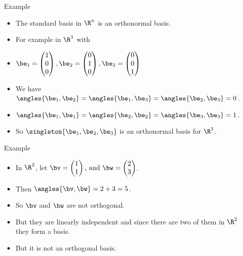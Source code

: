 \documentclass{beamer}
\begin{document}
\begin{frame}{Example}

\begin{itemize}
\item The standard basis in $\R^n$ is an orthonormal basis.
\item For example in $\R^3$ with
\item $\be_1=
\begin{pmatrix}
1\\0\\0
\end{pmatrix},
\be_2=
\begin{pmatrix}
0\\1\\0
\end{pmatrix},
\be_3=
\begin{pmatrix}
0\\0\\1
\end{pmatrix}
$
\item We have $\angles{\be_1,\be_2} = \angles{\be_1,\be_3} = \angles{\be_2,\be_3} = 0$.
\item $\angles{\be_1,\be_1}=\angles{\be_2,\be_2}=\angles{\be_3,\be_3}=1$.
\item So $\singleton{\be_1,\be_2,\be_3}$ is an orthonormal basis for $\R^3$.
\end{itemize}
\end{frame}

\begin{frame}{Example}

\begin{itemize}
\item In $\R^2$, let $\bv=
\begin{pmatrix}
1 \\ 1
\end{pmatrix}
\text{, and }
\bw=
\begin{pmatrix}
2 \\ 3
\end{pmatrix}
$.
\item Then $\angles{\bv,\bw} = 2 + 3 = 5$.
\item So $\bv$ and $\bw$ are not orthogonal.
\item But they are linearly independent and since there are two of them in $\R^2$ they form a basis.
\item But it is not an orthogonal basis.
\end{itemize}
\end{frame}
\end{document}
